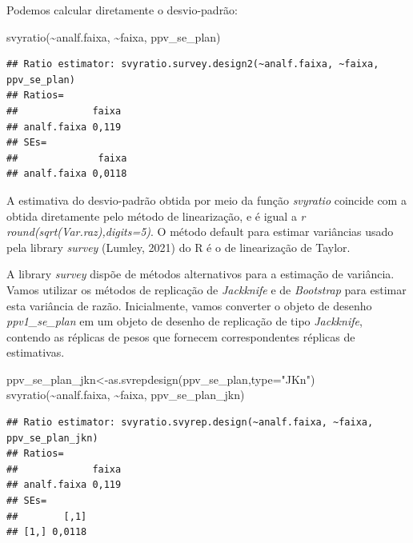 \documentclass[
  12pt,
  brazilian,
]{book}
\newenvironment{Shaded}{\begin{snugshade}}{\end{snugshade}}
\newcommand{\AttributeTok}[1]{\textcolor[rgb]{0.77,0.63,0.00}{#1}}
\newcommand{\FunctionTok}[1]{\textcolor[rgb]{0.00,0.00,0.00}{#1}}
\newcommand{\NormalTok}[1]{#1}
\newcommand{\OtherTok}[1]{\textcolor[rgb]{0.56,0.35,0.01}{#1}}
\newcommand{\SpecialCharTok}[1]{\textcolor[rgb]{0.00,0.00,0.00}{#1}}
\newcommand{\StringTok}[1]{\textcolor[rgb]{0.31,0.60,0.02}{#1}}
\theoremstyle{definition}
\theoremstyle{definition}
\theoremstyle{definition}
\theoremstyle{definition}
\theoremstyle{remark}
\begin{document}
Podemos calcular diretamente o desvio-padrão:

\begin{Shaded}
\begin{Highlighting}[]
\FunctionTok{svyratio}\NormalTok{(}\SpecialCharTok{\textasciitilde{}}\NormalTok{analf.faixa, }\SpecialCharTok{\textasciitilde{}}\NormalTok{faixa, ppv\_se\_plan)}
\end{Highlighting}
\end{Shaded}

\begin{verbatim}
## Ratio estimator: svyratio.survey.design2(~analf.faixa, ~faixa, ppv_se_plan)
## Ratios=
##             faixa
## analf.faixa 0,119
## SEs=
##              faixa
## analf.faixa 0,0118
\end{verbatim}

A estimativa do desvio-padrão obtida por meio da função \emph{svyratio} coincide com a obtida diretamente pelo método
de linearização, e é igual a \emph{r round(sqrt(Var.raz),digits=5)}. O método default para estimar variâncias
usado pela library \emph{survey} (Lumley, 2021) do R é o de linearização de Taylor.

A library \emph{survey} dispõe de métodos alternativos para a estimação de variância. Vamos utilizar os métodos de replicação
de \emph{Jackknife} e de \emph{Bootstrap} para estimar esta variância de razão. Inicialmente, vamos converter o objeto de desenho \emph{ppv1\_se\_plan} em um objeto de desenho de replicação de tipo \emph{Jackknife}, contendo as réplicas de pesos que fornecem correspondentes réplicas de estimativas.

\begin{Shaded}
\begin{Highlighting}[]
\NormalTok{ppv\_se\_plan\_jkn}\OtherTok{\textless{}{-}}\FunctionTok{as.svrepdesign}\NormalTok{(ppv\_se\_plan,}\AttributeTok{type=}\StringTok{"JKn"}\NormalTok{)}
\FunctionTok{svyratio}\NormalTok{(}\SpecialCharTok{\textasciitilde{}}\NormalTok{analf.faixa, }\SpecialCharTok{\textasciitilde{}}\NormalTok{faixa, ppv\_se\_plan\_jkn)}
\end{Highlighting}
\end{Shaded}

\begin{verbatim}
## Ratio estimator: svyratio.svyrep.design(~analf.faixa, ~faixa, ppv_se_plan_jkn)
## Ratios=
##             faixa
## analf.faixa 0,119
## SEs=
##        [,1]
## [1,] 0,0118
\end{verbatim}
\end{document}
